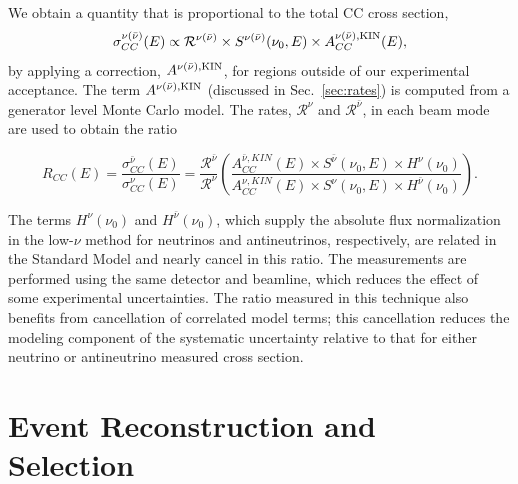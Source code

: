 \documentclass[aps,preprint,showpacs,superscriptaddress,linenumbers,nofootinbib,prd,12pt]{revtex4}
\newcommand{\ratio}{\ensuremath{R_{CC}}}
\newcommand{\nucor}{\ensuremath{S^{\nu(\bar{\nu})}(\nu_0,E)}}
\newcommand{\nucornu}{\ensuremath{S^{\nu}(\nu_0,E)}}
\newcommand{\nucornubar}{\ensuremath{S^{\bar{\nu}}(\nu_0,E)}}
\newcommand{\realhnu}{\ensuremath{H^{\nu}(\nu_0)}}
\newcommand{\realhnubar}{\ensuremath{H^{\bar{\nu}}(\nu_0)}}
\newcommand{\xsec}{\ensuremath{\sigma_{CC}^{\nu(\bar{\nu})}(E)}}
\newcommand{\xsecnu}{\ensuremath{\sigma_{CC}^{\nu}(E)}}
\newcommand{\xsecnubar}{\ensuremath{\sigma_{CC}^{\bar{\nu}}(E)}}
\begin{document}
We obtain a quantity that is proportional to the total CC cross section,
\begin{equation}
\xsec{} \propto  \mathcal{R}^{\nu(\bar{\nu})}  \times \nucor{} \times A^{\nu(\bar{\nu}),{\rm KIN}}_{CC}(E),
\label{eq:prop_sigma_nu}
\end{equation}
by applying a correction, $A^{\nu(\bar{\nu}),{\rm KIN}}$, for regions outside of our experimental acceptance.
The term $A^{\nu(\bar{\nu}),{\rm KIN}}$ (discussed in Sec.~\ref{sec:rates}) is computed from a generator 
level Monte Carlo model.
The rates, $\mathcal{R}^{\nu}$ and $\mathcal{R}^{\bar{\nu}}$, in each beam mode
are used to obtain the ratio
\begin{widetext}
\begin{equation}
\ratio(E)=\frac{\xsecnubar{}}{\xsecnu{}}= 
\frac{\mathcal{R}^{\bar{\nu}}}{\mathcal{R}^{\nu}} 
\left( \frac{ A^{\bar{\nu}, KIN}_{CC}(E) \times \nucornubar{} \times \realhnu{} }
{A^{\nu, KIN}_{CC}(E) \times \nucornu{} \times \realhnubar{}}
\right).
\label{eq:ratio}
\end{equation}
\end{widetext}
The terms $\realhnu{}$ and $\realhnubar{}$, which supply the absolute flux normalization in 
the low-$\nu$ method for neutrinos and antineutrinos, respectively,
are related in the Standard Model and nearly cancel in this ratio.
The measurements are performed using 
the same detector and beamline, which reduces the effect of some experimental uncertainties.
The ratio measured in this technique also benefits from cancellation of 
correlated model terms; this cancellation reduces the modeling component of the systematic uncertainty 
relative to that for either neutrino or antineutrino measured cross section.

\section{Event Reconstruction and Selection}
\end{document}
